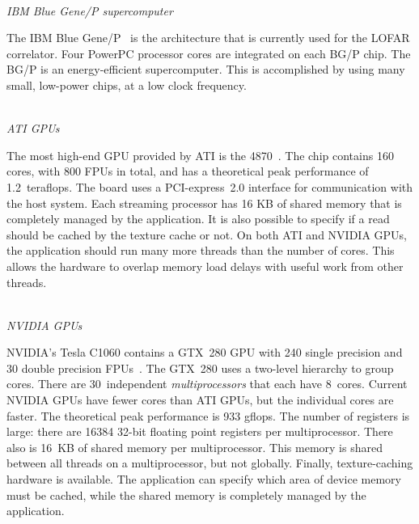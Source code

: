 \documentclass{article}
\begin{document}

\noindent \\ \emph{IBM Blue Gene/P supercomputer}

\noindent The IBM Blue Gene/P~\cite{IBM:08} is the architecture that is
currently used for the LOFAR correlator.
Four PowerPC processor cores are integrated on each BG/P chip.
The BG/P is an energy-efficient supercomputer.
This is accomplished by using many small, low-power chips, at a low clock
frequency.


\noindent \\ \emph{ATI GPUs}

\noindent The most high-end GPU provided by ATI is
the 4870~\cite{amd-manual}.  The chip contains 160 cores, with 800 FPUs in total, 
and has a theoretical peak performance of
1.2~teraflops. The board uses a PCI-express~2.0 interface
for communication with the host system.
Each streaming processor has 16 KB of shared
memory that is completely managed by the application. It is also
possible to specify if a read should be
cached by the texture cache or not.
On both ATI and NVIDIA GPUs, the application should run many more threads
than the number of cores. This allows the hardware to overlap memory load delays with useful
work from other threads.


\noindent \\ \emph{NVIDIA GPUs}

\noindent NVIDIA's Tesla C1060 contains a GTX~280 GPU with 240 single
precision and 30 double precision FPUs~\cite{cuda-manual}. The GTX~280
uses a two-level hierarchy to group cores.  There are 30~independent
\emph{multiprocessors\/} that each have 8~cores.  Current NVIDIA GPUs
have fewer cores than ATI GPUs, but the individual cores are faster.
The theoretical peak performance is 933 gflops.  The number of
registers is large: there are 16384 32-bit floating point registers
per multiprocessor. There also is 16~KB of shared memory per
multiprocessor.  This memory is shared between all threads on a
multiprocessor, but not globally.  Finally, texture-caching hardware
is available.  The application can specify which area of device memory
must be cached, while the shared memory is completely managed by the
application.
\end{document}
